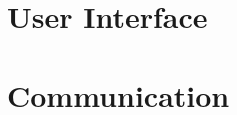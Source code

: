 
\section{User Interface}\label{s:impl-ui}




\section{Communication}\label{s:impl-communication}


